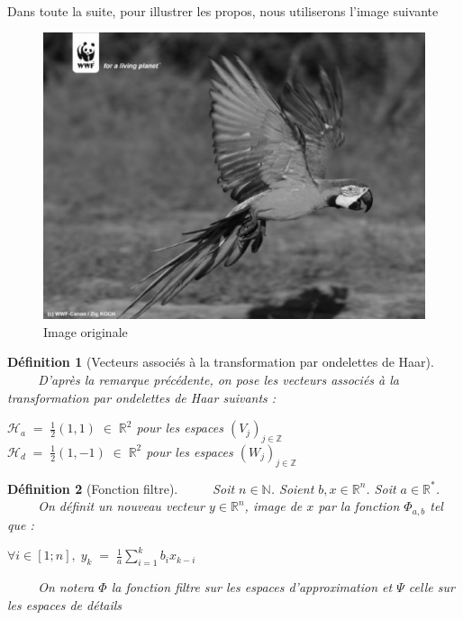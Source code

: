 \documentclass[a4paper,10pt]{report}
\theoremstyle{break}
\newtheorem{Def}{D\'{e}finition}
\begin{document}
    \paragraph{} Dans toute la suite, pour illustrer les propos, nous utiliserons l'image suivante
	\begin{figure}[!h]
	    \centering
	    
	    \includegraphics[width = 0.4 \linewidth]{ara_orig.eps}
	    
	    \caption{Image originale}
	\end{figure}
	
    \begin{Def}[Vecteurs associ\'{e}s \`{a} la transformation par ondelettes de Haar]
      $\phantom{Prop}$ D'apr\`{e}s la remarque pr\'{e}c\'{e}dente, on pose les vecteurs associ\'{e}s \`{a} 
      la transformation par ondelettes de Haar suivants :
      \begin{center}
	$ \mathcal{H}_a \; = \; \frac{1}{2} (1, 1) \; \in \; \mathbb{R}^2 $ pour les espaces $(V_j)_{j \in \mathbb{Z}}$ \\
	$ \mathcal{H}_d \; = \; \frac{1}{2} (1, -1) \; \in \; \mathbb{R}^2 $ pour les espaces $(W_j)_{j \in \mathbb{Z}}$
      \end{center}
    \end{Def}
	
    \begin{Def}[Fonction filtre]
	$\phantom{Prop}$ Soit $ n \in \mathbb{N} $. Soient $ b, x \in \mathbb{R}^n $. Soit $ a \in \mathbb{R}^* $. \newline
	$\phantom{Prop}$ On d\'{e}finit un nouveau vecteur $ y \in \mathbb{R}^n $, image de $x$ par la fonction $ \Phi_{a,b} $ tel que :
	\begin{center}
	  $ \forall i \in [1;n], \; y_k \; = \; \frac{1}{a} \displaystyle\sum_{i = 1}^k b_i x_{k - i} $
	\end{center}
	$\phantom{Prop}$ On notera $\varPhi$ la fonction filtre sur les espaces d'approximation
	et $\varPsi$ celle sur les espaces de d\'{e}tails
    \end{Def}
	
\end{document}

